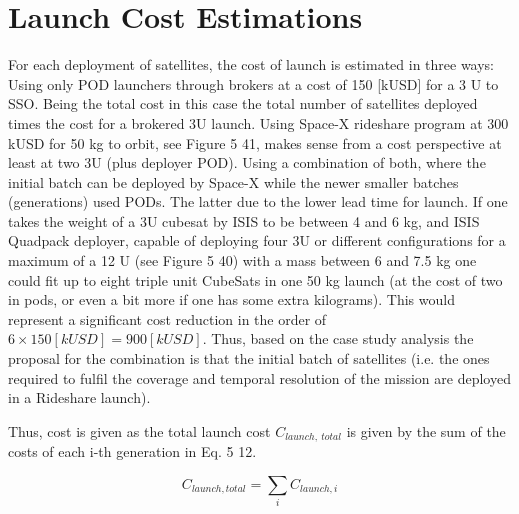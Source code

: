 \section{Launch Cost Estimations}

For each deployment of satellites, the cost of launch is estimated in three ways:
	Using only POD launchers through brokers at a cost of 150 [kUSD] for a 3 U to SSO. Being the total cost in this case the total number of satellites deployed times the cost for a brokered 3U launch.
	Using Space-X rideshare program at 300 kUSD for 50 kg to orbit, see Figure 5 41, makes sense from a cost perspective at least at two 3U (plus deployer POD). 
	Using a combination of both, where the initial batch can be deployed by Space-X while the newer smaller batches (generations) used PODs. The latter due to the lower lead time for launch.
	If one takes the weight of a 3U cubesat  by ISIS to be between 4 and 6 kg, and ISIS Quadpack deployer, capable of deploying four 3U or different configurations for a maximum of a 12 U (see Figure 5 40) with a mass between 6 and 7.5 kg one could fit up to eight triple unit CubeSats in one 50 kg launch (at the cost of two in pods, or even a bit more if one has some extra kilograms). 
	This would represent a significant cost reduction in the order of \(6\times150\left[kUSD\right]=900[kUSD]\). 
	Thus, based on the case study analysis the proposal for the combination is that the initial batch of satellites (i.e. the ones required to fulfil the coverage and temporal resolution of the mission are deployed in a Rideshare launch). 

Thus, cost is given as the total launch cost \(C_{launch,\ total}\) is given by the sum of the costs of each i-th generation in Eq. 5 12.

\[C_{launch,total}=\sum_{i}C_{launch,i}\]


